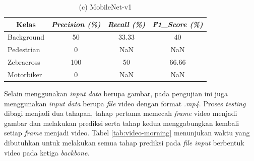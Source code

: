 \begin{table}[!h]
\begin{minipage}[b]{\textwidth}
	\end{minipage}
	\vfill
	\begin{minipage}[b]{\textwidth}
		\centering
		\caption*{(c) MobileNet-v1}
		\begin{tabular}{|l|c|c|c|}
			\hline
			\multicolumn{1}{|c|}{\textbf{Kelas}} & \textit{\textbf{Precision (\%)}} & \textit{\textbf{Recall (\%)}} & \textit{\textbf{F1\_Score (\%)}} \\ \hline
			Background                           & 50                               & 33.33                         & 40                               \\ \hline
			Pedestrian                           & 0                                & NaN                           & NaN                              \\ \hline
			Zebracross                           & 100                              & 50                            & 66.66                            \\ \hline
			Motorbiker                           & 0                                & NaN                           & NaN                              \\ \hline
		\end{tabular}
	\end{minipage}
	\label{tab:evaluate-morning}
\end{table}

Selain menggunakan \textit{input data} berupa gambar, pada pengujian ini juga menggunakan \textit{input data} berupa \textit{file} video dengan format \textit{.mp4}. Proses \textit{testing} dibagi menjadi dua tahapan, tahap pertama memecah \textit{frame} video menjadi gambar dan melakukan prediksi serta tahap kedua menggabungkan kembali setiap \textit{frame} menjadi video. Tabel \ref{tab:video-morning} menunjukan waktu yang dibutuhkan untuk melakukan semua tahap prediksi pada \textit{file input} berbentuk video pada ketiga \textit{backbone}.

